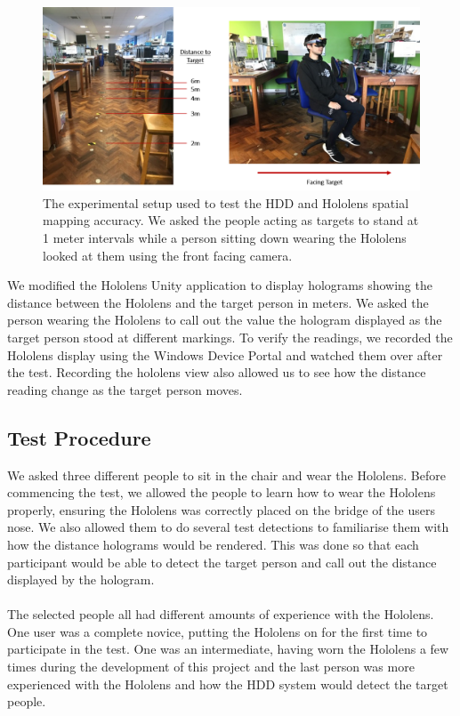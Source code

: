 \begin{figure}[ht]
	\centering
	\includegraphics[width=1.0\linewidth]{img/chapter6_test/hddTestSetup.png}
	\caption{The experimental setup used to test the HDD and Hololens spatial mapping accuracy. We asked the people acting as targets to stand at 1 meter intervals while a person sitting down wearing the Hololens looked at them using the front facing camera.}
	\label{fig:hddTestSetup}
\end{figure}
 
We modified the Hololens Unity application to display holograms showing the distance between the Hololens and the target person in meters. We asked the person wearing the Hololens to call out the value the hologram displayed as the target person stood at different markings. To verify the readings, we recorded the Hololens display using the Windows Device Portal and watched them over after the test. Recording the hololens view also allowed us to see how the distance reading change as the target person moves.
 
\subsection{Test Procedure}
We asked three different people to sit in the chair and wear the Hololens. Before commencing the test, we allowed the people to learn how to wear the Hololens properly, ensuring the Hololens was correctly placed on the bridge of the users nose. We also allowed them to do several test detections to familiarise them with how the distance holograms would be rendered. This was done so that each participant would be able to detect the target person and call out the distance displayed by the hologram.

\paragraph{} The selected people all had different amounts of experience with the Hololens. One user was a complete novice, putting the Hololens on for the first time to participate in the test. One was an intermediate, having worn the Hololens a few times during the development of this project and the last person was more experienced with the Hololens and how the HDD system would detect the target people.


